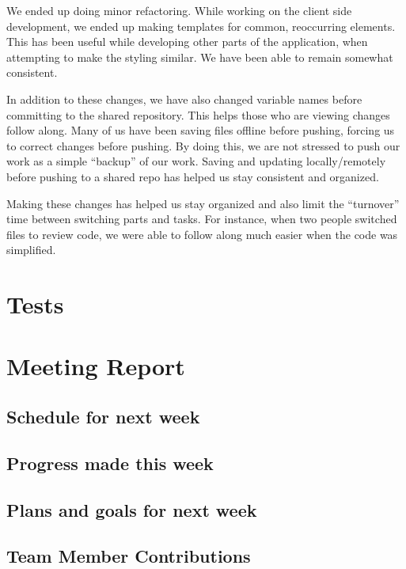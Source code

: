 \documentclass[12pt]{article}
\begin{document}
We ended up doing minor refactoring. While working on the client side
development, we ended up making templates for common, reoccurring elements.
This has been useful while developing other parts of the application, when
attempting to make the styling similar. We have been able to remain somewhat
consistent.

In addition to these changes, we have also changed variable names before
committing to the shared repository. This helps those who are viewing
changes follow along. Many of us have been saving files offline before
pushing, forcing us to correct changes before pushing. By doing this, we are
not stressed to push our work as a simple “backup” of our work. Saving and
updating locally/remotely before pushing to a shared repo has helped us stay
consistent and organized.

Making these changes has helped us stay organized and also limit the
“turnover” time between switching parts and tasks. For instance, when two
people switched files to review code, we were able to follow along much
easier when the code was simplified.

\section{Tests}



\section{Meeting Report}
\subsection{Schedule for next week}

\subsection{Progress made this week}

\subsection{Plans and goals for next week}
\subsection{Team Member Contributions}
\end{document}

